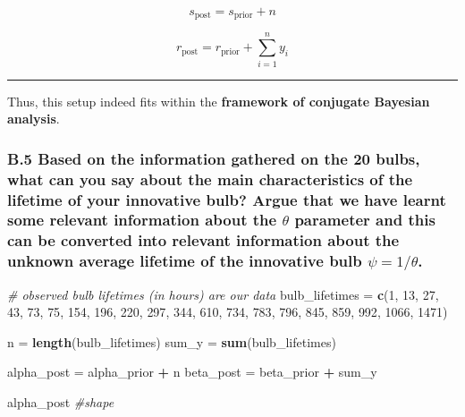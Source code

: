 \documentclass[
]{article}
\newenvironment{Shaded}{\begin{snugshade}}{\end{snugshade}}
\newcommand{\CommentTok}[1]{\textcolor[rgb]{0.56,0.35,0.01}{\textit{#1}}}
\newcommand{\DecValTok}[1]{\textcolor[rgb]{0.00,0.00,0.81}{#1}}
\newcommand{\FunctionTok}[1]{\textcolor[rgb]{0.13,0.29,0.53}{\textbf{#1}}}
\newcommand{\NormalTok}[1]{#1}
\newcommand{\OtherTok}[1]{\textcolor[rgb]{0.56,0.35,0.01}{#1}}
\newcommand{\SpecialCharTok}[1]{\textcolor[rgb]{0.81,0.36,0.00}{\textbf{#1}}}
\begin{document}
\[
s_{\text{post}} = s_{\text{prior}} + n
\]

\[
r_{\text{post}} = r_{\text{prior}} + \sum_{i=1}^n y_i
\]

\begin{center}\rule{0.5\linewidth}{0.5pt}\end{center}

Thus, this setup indeed fits within the \textbf{framework of conjugate
Bayesian analysis}.

\subsubsection{\texorpdfstring{B.5 Based on the information gathered on
the 20 bulbs, what can you say about the main characteristics of the
lifetime of your innovative bulb? Argue that we have learnt some
relevant information about the \(\theta\) parameter and this can be
converted into relevant information about the unknown average lifetime
of the innovative bulb
\(\psi=1/\theta\).}{B.5 Based on the information gathered on the 20 bulbs, what can you say about the main characteristics of the lifetime of your innovative bulb? Argue that we have learnt some relevant information about the \textbackslash theta parameter and this can be converted into relevant information about the unknown average lifetime of the innovative bulb \textbackslash psi=1/\textbackslash theta.}}\label{b.5-based-on-the-information-gathered-on-the-20-bulbs-what-can-you-say-about-the-main-characteristics-of-the-lifetime-of-your-innovative-bulb-argue-that-we-have-learnt-some-relevant-information-about-the-theta-parameter-and-this-can-be-converted-into-relevant-information-about-the-unknown-average-lifetime-of-the-innovative-bulb-psi1theta.}

\begin{Shaded}
\begin{Highlighting}[]
\CommentTok{\# observed bulb lifetimes (in hours) are our data}
\NormalTok{bulb\_lifetimes }\OtherTok{=} \FunctionTok{c}\NormalTok{(}\DecValTok{1}\NormalTok{, }\DecValTok{13}\NormalTok{, }\DecValTok{27}\NormalTok{, }\DecValTok{43}\NormalTok{, }\DecValTok{73}\NormalTok{, }\DecValTok{75}\NormalTok{, }\DecValTok{154}\NormalTok{, }\DecValTok{196}\NormalTok{, }\DecValTok{220}\NormalTok{, }\DecValTok{297}\NormalTok{,}
                    \DecValTok{344}\NormalTok{, }\DecValTok{610}\NormalTok{, }\DecValTok{734}\NormalTok{, }\DecValTok{783}\NormalTok{, }\DecValTok{796}\NormalTok{, }\DecValTok{845}\NormalTok{, }\DecValTok{859}\NormalTok{, }\DecValTok{992}\NormalTok{, }\DecValTok{1066}\NormalTok{, }\DecValTok{1471}\NormalTok{)}

\NormalTok{n }\OtherTok{=} \FunctionTok{length}\NormalTok{(bulb\_lifetimes)}
\NormalTok{sum\_y }\OtherTok{=} \FunctionTok{sum}\NormalTok{(bulb\_lifetimes)}

\NormalTok{alpha\_post }\OtherTok{=}\NormalTok{ alpha\_prior }\SpecialCharTok{+}\NormalTok{ n}
\NormalTok{beta\_post }\OtherTok{=}\NormalTok{ beta\_prior }\SpecialCharTok{+}\NormalTok{ sum\_y}

\NormalTok{alpha\_post }\CommentTok{\#shape}
\end{Highlighting}
\end{Shaded}
\end{document}
